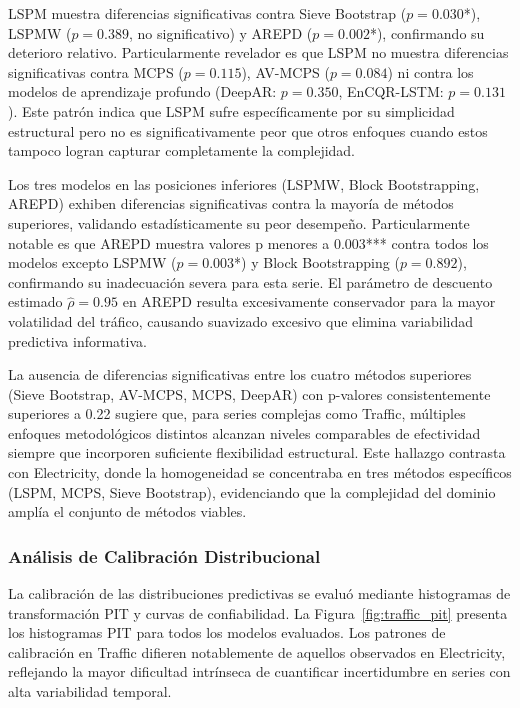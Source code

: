 LSPM muestra diferencias significativas contra Sieve Bootstrap ($p = 0.030$*), LSPMW ($p = 0.389$, no significativo) y AREPD ($p = 0.002$*), confirmando su deterioro relativo. Particularmente revelador es que LSPM no muestra diferencias significativas contra MCPS ($p = 0.115$), AV-MCPS ($p = 0.084$) ni contra los modelos de aprendizaje profundo (DeepAR: $p = 0.350$, EnCQR-LSTM: $p = 0.131$). Este patrón indica que LSPM sufre específicamente por su simplicidad estructural pero no es significativamente peor que otros enfoques cuando estos tampoco logran capturar completamente la complejidad.

Los tres modelos en las posiciones inferiores (LSPMW, Block Bootstrapping, AREPD) exhiben diferencias significativas contra la mayoría de métodos superiores, validando estadísticamente su peor desempeño. Particularmente notable es que AREPD muestra valores p menores a 0.003*** contra todos los modelos excepto LSPMW ($p = 0.003$*) y Block Bootstrapping ($p = 0.892$), confirmando su inadecuación severa para esta serie. El parámetro de descuento estimado $\hat{\rho} = 0.95$ en AREPD resulta excesivamente conservador para la mayor volatilidad del tráfico, causando suavizado excesivo que elimina variabilidad predictiva informativa.

La ausencia de diferencias significativas entre los cuatro métodos superiores (Sieve Bootstrap, AV-MCPS, MCPS, DeepAR) con p-valores consistentemente superiores a 0.22 sugiere que, para series complejas como Traffic, múltiples enfoques metodológicos distintos alcanzan niveles comparables de efectividad siempre que incorporen suficiente flexibilidad estructural. Este hallazgo contrasta con Electricity, donde la homogeneidad se concentraba en tres métodos específicos (LSPM, MCPS, Sieve Bootstrap), evidenciando que la complejidad del dominio amplía el conjunto de métodos viables.

\subsubsection{Análisis de Calibración Distribucional}

La calibración de las distribuciones predictivas se evaluó mediante histogramas de transformación PIT y curvas de confiabilidad. La Figura~\ref{fig:traffic_pit} presenta los histogramas PIT para todos los modelos evaluados. Los patrones de calibración en Traffic difieren notablemente de aquellos observados en Electricity, reflejando la mayor dificultad intrínseca de cuantificar incertidumbre en series con alta variabilidad temporal.

